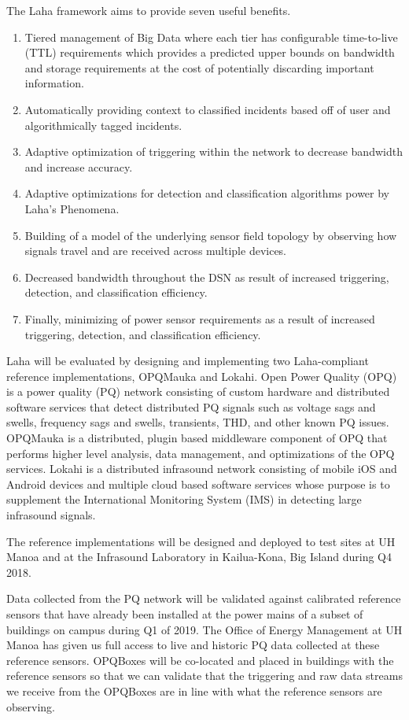 The Laha framework aims to provide seven useful benefits.
\begin{enumerate}
	\item Tiered management of Big Data where each tier has configurable time-to-live (TTL) requirements which provides a predicted upper bounds on bandwidth and storage requirements at the cost of potentially discarding important information.
	\item Automatically providing context to classified incidents based off of user and algorithmically tagged incidents. 
	\item Adaptive optimization of triggering within the network to decrease bandwidth and increase accuracy.
	\item Adaptive optimizations for detection and classification algorithms power by Laha's Phenomena.
	\item Building of a model of the underlying sensor field topology by observing how signals travel and are received across multiple devices.
	\item Decreased bandwidth throughout the DSN as result of increased triggering, detection, and classification efficiency.
	\item Finally, minimizing of power sensor requirements as a result of increased triggering, detection, and classification efficiency.
\end{enumerate}

Laha will be evaluated by designing and implementing two Laha-compliant reference implementations, OPQMauka and Lokahi. Open Power Quality (OPQ) is a power quality (PQ) network consisting of custom hardware and distributed software services that detect distributed PQ signals such as voltage sags and swells, frequency sags and swells, transients, THD, and other known PQ issues. OPQMauka is a distributed, plugin based middleware component of OPQ that performs higher level analysis, data management, and optimizations of the OPQ services. Lokahi is a distributed infrasound network consisting of mobile iOS and Android devices and multiple cloud based software services whose purpose is to supplement the International Monitoring System (IMS) in detecting large infrasound signals.

The reference implementations will be designed and deployed to test sites at UH Manoa and at the Infrasound Laboratory in Kailua-Kona, Big Island during Q4 2018. 

Data collected from the PQ network will be validated against calibrated reference sensors that have already been installed at the power mains of a subset of buildings on campus during Q1 of 2019. The Office of Energy Management at UH Manoa has given us full access to live and historic PQ data collected at these reference sensors. OPQBoxes will be co-located and placed in buildings with the reference sensors so that we can validate that the triggering and raw data streams we receive from the OPQBoxes are in line with what the reference sensors are observing.


